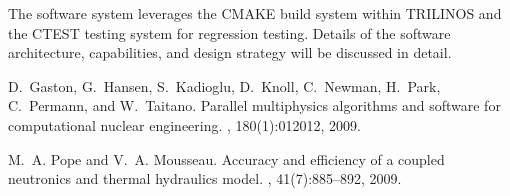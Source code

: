 The software system leverages the CMAKE build system within TRILINOS and the CTEST 
testing system for regression testing. Details of the software architecture, capabilities, and
design strategy will be discussed in detail.


%
\begin{thebibliography}{1}

D.~Gaston, G.~Hansen, S.~Kadioglu, D.~Knoll, C.~Newman, H.~Park, C.~Permann,
  and W.~Taitano.
\newblock Parallel multiphysics algorithms and software for computational
  nuclear engineering.
, 180(1):012012, 2009.

M.~A. Pope and V.~A. Mousseau.
\newblock Accuracy and efficiency of a coupled neutronics and thermal
  hydraulics model.
, 41(7):885--892, 2009.

\end{thebibliography}



